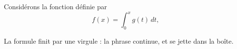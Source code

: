 Considérons la fonction définie par
\[
  f(x) = \int_0^x g(t) \, dt,
\]
\begin{proposition} %
  La formule finit par une virgule : la phrase continue, et se jette dans la
  boîte.
\end{proposition}
